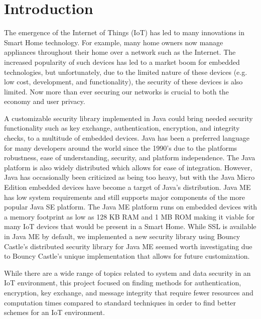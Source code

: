 \section{Introduction}
The emergence of the Internet of Things (IoT) has led to many innovations in Smart Home technology. For example, many home owners now manage appliances throughout their home over a network such as the Internet. The increased popularity of such devices has led to a market boom for embedded technologies, but unfortunately, due to the limited nature of these devices (e.g. low cost, development, and functionality), the security of these devices is also limited. Now more than ever securing our networks is crucial to both the economy and user privacy.

A customizable security library implemented in Java could bring needed security functionality such as key exchange, authentication, encryption, and integrity checks, to a multitude of embedded devices. Java has been a preferred language for many developers around the world since the 1990's due to the platforms robustness, ease of understanding, security, and platform independence. The Java platform is also widely distributed which allows for ease of integration. However, Java has occasionally been criticized as being too heavy, but with the Java Micro Edition embedded devices have become a target of Java's distribution. Java ME has low system requirements and still supports major components of the more popular Java SE platform. The Java ME platform runs on embedded devices with a memory footprint as low as 128 KB RAM and 1 MB ROM making it viable for many IoT devices that would be present in a Smart Home. While SSL is available in Java ME by default, we implemented a new security library using Bouncy Castle's distributed security library for Java ME seemed worth investigating due to Bouncy Castle's unique implementation that allows for future customization.

While there are a wide range of topics related to system and data security in an IoT environment, this project focused on finding methods for authentication, encryption, key exchange, and message integrity that require fewer resources and computation times compared to standard techniques in order to find better schemes for an IoT environment. 

